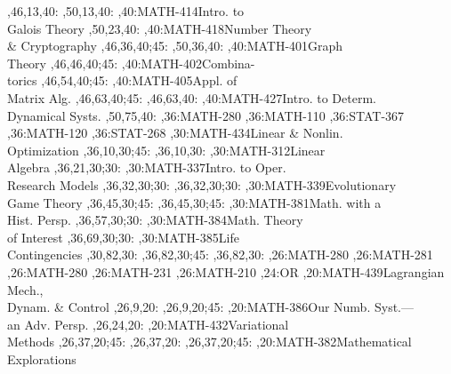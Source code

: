 \documentclass[9pt]{extarticle}
\begin{document}
\begin{chart}
  ,46,13,40:
  ,50,13,40:
,40:{MATH-414}{Intro. to\\Galois Theory}{}
  ,50,23,40:
,40:{MATH-418}{Number Theory\\\& Cryptography}{}
  ,46,36,40;45:
  ,50,36,40:
,40:{MATH-401}{Graph\\Theory}{}
  ,46,46,40;45:
,40:{MATH-402}{Combina-\\torics}{}
  ,46,54,40;45:
,40:{MATH-405}{Appl. of\\Matrix Alg.}{}
  ,46,63,40;45:
  ,46,63,40:
,40:{MATH-427}{Intro. to Determ.\\Dynamical Systs.}{}
  ,50,75,40:
,36:{MATH-280}
,36:{MATH-110}
,36:{STAT-367}
,36:{MATH-120}
,36:{STAT-268}
,30:{MATH-434}{Linear \& Nonlin.\\Optimization}{}
  ,36,10,30;45:
  ,36,10,30:
,30:{MATH-312}{Linear\\Algebra}{}
  ,36,21,30;30:
,30:{MATH-337}{Intro. to Oper.\\Research Models}{}
  ,36,32,30;30:
  ,36,32,30;30:
,30:{MATH-339}{Evolutionary\\Game Theory}{}
  ,36,45,30;45:
  ,36,45,30;45:
,30:{MATH-381}{Math. with a\\Hist. Persp.}{}
  ,36,57,30;30:
,30:{MATH-384}{Math. Theory\\of Interest}{}
  ,36,69,30;30:
,30:{MATH-385}{Life\\Contingencies}{}
  ,30,82,30:
  ,36,82,30;45:
  ,36,82,30:
,26:{MATH-280}
,26:{MATH-281}
,26:{MATH-280}
,26:{MATH-231}
,26:{MATH-210}
,24:{OR}
,20:{MATH-439}{Lagrangian Mech.,\\Dynam. \& Control}{}
  ,26,9,20:
  ,26,9,20;45:
,20:{MATH-386}{Our Numb. Syst.---\\an Adv. Persp.}{}
  ,26,24,20:
,20:{MATH-432}{Variational\\Methods}{}
  ,26,37,20;45:
  ,26,37,20:
  ,26,37,20;45:
,20:{MATH-382}{Mathematical\\Explorations}{}

\end{chart}
\end{document}
